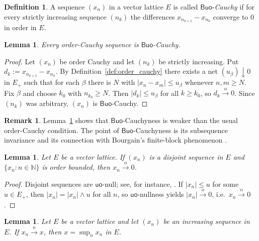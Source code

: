 \documentclass[11pt]{amsart}
\newtheorem{lemma}[theorem]{Lemma}
\theoremstyle{definition}
\newtheorem{definition}[theorem]{Definition}
\newtheorem{remark}[theorem]{Remark}
\newcommand{\N}{\mathbb{N}}
\newcommand{\uo}{\ensuremath{\mathsf{uo}}}
\newcommand{\Buo}{\ensuremath{\mathsf{Buo}}}
\renewcommand{\le}{\leqslant}
\renewcommand{\ge}{\geqslant}
\begin{document}
\begin{definition}\label{def:buo_cauchy}
A sequence $(x_n)$ in a vector lattice $E$ is called \Buo-\emph{Cauchy} if for
every strictly increasing sequence $(n_k)$ the differences
$x_{n_{k+1}}-x_{n_k}$ converge to $0$ in order in $E$.
\end{definition}

\begin{lemma}\label{lem:order_cauchy_implies_Buo_cauchy}
Every order-Cauchy sequence is \Buo-Cauchy.
\end{lemma}

\begin{proof}
Let $(x_n)$ be order Cauchy and let $(n_k)$ be strictly increasing.
Put $d_k:=x_{n_{k+1}}-x_{n_k}$.
By Definition~\ref{def:order_cauchy} there exists a net $(u_\beta)\downarrow 0$ in $E_+$ such that
for each $\beta$ there is $N$ with $|x_n-x_m|\le u_\beta$ whenever $n,m\ge N$.
Fix $\beta$ and choose $k_0$ with $n_{k_0}\ge N$. Then $|d_k|\le u_\beta$ for all $k\ge k_0$,
so $d_k\xrightarrow{\mathrm{o}}0$. Since $(n_k)$ was arbitrary, $(x_n)$ is \Buo-Cauchy.
\end{proof}

\begin{remark}\label{rem:BuoCauchy_vs_orderCauchy}
Lemma~\ref{lem:order_cauchy_implies_Buo_cauchy} shows that \Buo-Cauchyness is weaker
than the usual order-Cauchy condition.  The point of \Buo-Cauchyness is its subsequence
invariance and its connection with Bourgain's finite-block phenomenon \cite{Bourgain81}.
\end{remark}

\begin{lemma}\label{lem:disjoint_order_null}
Let $E$ be a vector lattice. If $(x_n)$ is a disjoint sequence in $E$ and $\{x_n:n\in\N\}$ is order bounded,
then $x_n\xrightarrow{\mathrm{o}}0$.
\end{lemma}

\begin{proof}
Disjoint sequences are $\uo$-null; see, for instance, \cite[{\S}3]{GaoXanthos2014}.
If $|x_n|\le u$ for some $u\in E_+$, then $|x_n|=|x_n|\wedge u$ for all $n$, so $\uo$-nullness yields
$|x_n|\xrightarrow{\mathrm{o}}0$, i.e.\ $x_n\xrightarrow{\mathrm{o}}0$.
\end{proof}

\begin{lemma}\label{lem:monotone_order_limit}
Let $E$ be a vector lattice and let $(x_n)$ be an increasing sequence in $E$.
If $x_n\xrightarrow{\mathrm{o}}x$, then $x=\sup_n x_n$ in $E$.
\end{lemma}
\end{document}
